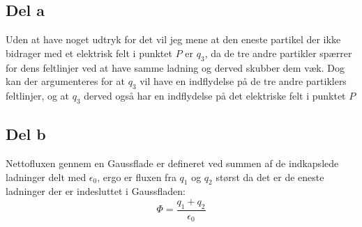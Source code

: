 \subsection{Del a} %
\label{sub:del_a}
Uden at have noget udtryk for det vil jeg mene at den eneste partikel der ikke bidrager med et elektrisk felt i punktet $P$ er $q_3$, da de tre andre partikler spærrer for dens feltlinjer ved at have samme ladning og derved skubber dem væk. Dog kan der argumenteres for at $q_3$ vil have en indflydelse på de tre andre partiklers feltlinjer, og at $q_3$ derved også har en indflydelse på det elektriske felt i punktet $P$

\subsection{Del b} %
\label{sub:del_b}
Nettofluxen gennem en Gaussflade er defineret ved summen af de indkapslede ladninger delt med $\epsilon _0$, ergo er fluxen fra $q_1$ og $q_2$ størst da det er de eneste ladninger der er indesluttet i Gaussfladen:
\begin{equation}
	\Phi = \frac{q_1 + q_2}{\epsilon _0}
\end{equation}
